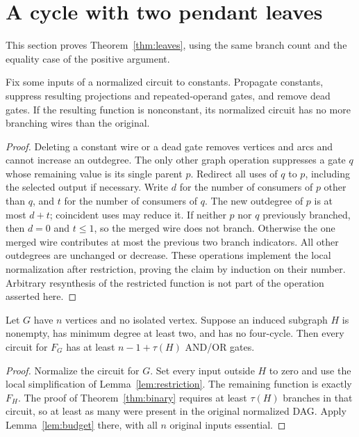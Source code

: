\section{A cycle with two pendant leaves}\label{sec:leaves}

This section proves Theorem~\ref{thm:leaves}, using the same branch count
and the equality case of the positive argument.

\begin{lemma}\label{lem:restriction}
Fix some inputs of a normalized circuit to constants. Propagate constants,
suppress resulting projections and repeated-operand gates, and remove
dead gates. If the resulting function is nonconstant, its normalized
circuit has no more branching wires than the original.
\end{lemma}
\begin{proof}
Deleting a constant wire or a dead gate removes vertices and arcs and
cannot increase an outdegree. The only other graph operation suppresses
a gate $q$ whose remaining value is its single parent $p$. Redirect all
uses of $q$ to $p$, including the selected output if necessary. Write
$d$ for the number of consumers of $p$ other than $q$, and $t$ for the
number of consumers of $q$. The new outdegree of $p$ is at most $d+t$;
coincident uses may reduce it. If neither $p$ nor $q$ previously branched,
then $d=0$ and $t\le1$, so the merged wire does not branch. Otherwise the
one merged wire contributes at most the previous two branch indicators.
All other outdegrees are unchanged or decrease. These operations implement
the local normalization after restriction, proving the claim by induction
on their number. Arbitrary resynthesis of the restricted function is not
part of the operation asserted here.
\end{proof}

\begin{corollary}\label{cor:core}
Let $G$ have $n$ vertices and no isolated vertex. Suppose an induced
subgraph $H$ is nonempty, has minimum degree at least two, and has no
four-cycle. Then
every circuit for $F_G$ has at least $n-1+\tau(H)$ AND/OR gates.
\end{corollary}
\begin{proof}
Normalize the circuit for $G$. Set every input outside $H$ to zero and
use the local simplification of Lemma~\ref{lem:restriction}. The remaining
function is exactly $F_H$. The proof of Theorem~\ref{thm:binary} requires
at least $\tau(H)$ branches in that circuit, so at least as many were
present in the original normalized DAG. Apply Lemma~\ref{lem:budget}
there, with all $n$ original inputs essential.
\end{proof}

